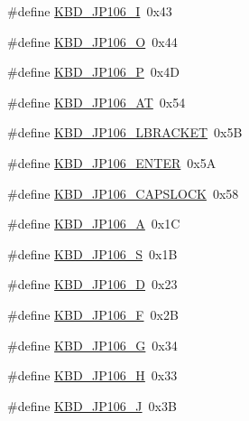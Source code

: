 \begin{DoxyCompactItemize}
\item 
\#define \hyperlink{kbd__jp106_8h_aa24024a9a5f4ce7fbbad5db10fb793c2_aa24024a9a5f4ce7fbbad5db10fb793c2}{K\+B\+D\+\_\+\+J\+P106\+\_\+\+I}~0x43
\item 
\#define \hyperlink{kbd__jp106_8h_aa276bc76bc8c8170faa3143f43431389_aa276bc76bc8c8170faa3143f43431389}{K\+B\+D\+\_\+\+J\+P106\+\_\+\+O}~0x44
\item 
\#define \hyperlink{kbd__jp106_8h_a46e628e9e0706bd57e61c6adc413248c_a46e628e9e0706bd57e61c6adc413248c}{K\+B\+D\+\_\+\+J\+P106\+\_\+\+P}~0x4\+D
\item 
\#define \hyperlink{kbd__jp106_8h_abdd0f20f1661eec39b04c1b92cc35268_abdd0f20f1661eec39b04c1b92cc35268}{K\+B\+D\+\_\+\+J\+P106\+\_\+\+A\+T}~0x54
\item 
\#define \hyperlink{kbd__jp106_8h_a7c599582bb3bb451f0fc5a63ffaf00b8_a7c599582bb3bb451f0fc5a63ffaf00b8}{K\+B\+D\+\_\+\+J\+P106\+\_\+\+L\+B\+R\+A\+C\+K\+E\+T}~0x5\+B
\item 
\#define \hyperlink{kbd__jp106_8h_a1c9fbf086447cffafff13dcb91144391_a1c9fbf086447cffafff13dcb91144391}{K\+B\+D\+\_\+\+J\+P106\+\_\+\+E\+N\+T\+E\+R}~0x5\+A
\item 
\#define \hyperlink{kbd__jp106_8h_a3dbc32c349f57dcc1cb218129e514183_a3dbc32c349f57dcc1cb218129e514183}{K\+B\+D\+\_\+\+J\+P106\+\_\+\+C\+A\+P\+S\+L\+O\+C\+K}~0x58
\item 
\#define \hyperlink{kbd__jp106_8h_a11ef36ca07322b3ca6d18d54f31e44ac_a11ef36ca07322b3ca6d18d54f31e44ac}{K\+B\+D\+\_\+\+J\+P106\+\_\+\+A}~0x1\+C
\item 
\#define \hyperlink{kbd__jp106_8h_a9a6d03222dca3fb33a12375c744f9667_a9a6d03222dca3fb33a12375c744f9667}{K\+B\+D\+\_\+\+J\+P106\+\_\+\+S}~0x1\+B
\item 
\#define \hyperlink{kbd__jp106_8h_a6d5da29b0752bbac8d53059d1a66afe7_a6d5da29b0752bbac8d53059d1a66afe7}{K\+B\+D\+\_\+\+J\+P106\+\_\+\+D}~0x23
\item 
\#define \hyperlink{kbd__jp106_8h_a4b2ae0091eda39f8654cff09bbba41e7_a4b2ae0091eda39f8654cff09bbba41e7}{K\+B\+D\+\_\+\+J\+P106\+\_\+\+F}~0x2\+B
\item 
\#define \hyperlink{kbd__jp106_8h_aa6e5fb9c444e65b0d40967dbc359aa9f_aa6e5fb9c444e65b0d40967dbc359aa9f}{K\+B\+D\+\_\+\+J\+P106\+\_\+\+G}~0x34
\item 
\#define \hyperlink{kbd__jp106_8h_ad328456ced4f35a427d3dd58c610ff0e_ad328456ced4f35a427d3dd58c610ff0e}{K\+B\+D\+\_\+\+J\+P106\+\_\+\+H}~0x33
\item 
\#define \hyperlink{kbd__jp106_8h_ad824fde394545674818817b3e997f0a3_ad824fde394545674818817b3e997f0a3}{K\+B\+D\+\_\+\+J\+P106\+\_\+\+J}~0x3\+B

\end{DoxyCompactItemize}
